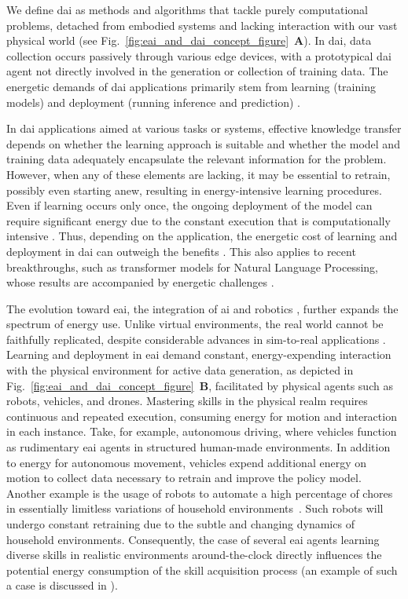 \documentclass[12pt]{article}
\begin{document}
We define \ac{dai} as methods and algorithms that tackle purely computational problems, detached from embodied systems and lacking interaction with our vast physical world (see Fig.~\ref{fig:eai_and_dai_concept_figure}~\textbf{A}). In \ac{dai}, data collection occurs passively through various edge devices, with a prototypical \ac{dai} agent not directly involved in the generation or collection of training data. The energetic demands of \ac{dai} applications primarily stem from learning (training models) and deployment (running inference and prediction) \cite{Vries2023growingenergyfootprint}.

In \ac{dai} applications aimed at various tasks or systems, effective knowledge transfer depends on whether the learning approach is suitable and whether the model and training data adequately encapsulate the relevant information for the problem. However, when any of these elements are lacking, it may be essential to retrain, possibly even starting anew, resulting in energy-intensive learning procedures. Even if learning occurs only once, the ongoing deployment of the model can require significant energy due to the constant execution that is computationally intensive \cite{Vries2023growingenergyfootprint}. Thus, depending on the application, the energetic cost of learning and deployment in \ac{dai} can outweigh the benefits \cite{Strubell2019EnergyPolicyConsiderations}. This also applies to recent breakthroughs, such as transformer models for Natural Language Processing, whose results are accompanied by energetic challenges \cite{Cao2020TowardsAccurateReliable}.

The evolution toward \ac{eai}, the integration of \ac{ai} and robotics \cite{Pfeifer2004Embodiedartificialintelligence}, further expands the spectrum of energy use. Unlike virtual environments, the real world cannot be faithfully replicated, despite considerable advances in sim-to-real applications \cite{Chebotar2019Closingsimreal}. Learning and deployment in \ac{eai} demand constant, energy-expending interaction with the physical environment for active data generation, as depicted in Fig.~\ref{fig:eai_and_dai_concept_figure}~\textbf{B}, facilitated by physical agents such as robots, vehicles, and drones. Mastering skills in the physical realm requires continuous and repeated execution, consuming energy for motion and interaction in each instance. Take, for example, autonomous driving, where vehicles function as rudimentary \ac{eai} agents in structured human-made environments. In addition to energy for autonomous movement, vehicles expend additional energy on motion to collect data necessary to retrain and improve the policy model. Another example is the usage of robots to automate a high percentage of chores in essentially limitless variations of household environments~\cite{Lehdonvirta2022futuresunpaidwork}. Such robots will undergo constant retraining due to the subtle and changing dynamics of household environments. Consequently, the case of several \ac{eai} agents learning diverse skills in realistic environments around-the-clock directly influences the potential energy consumption of the skill acquisition process (an example of such a case is discussed in \cite{Johannsmeier2025APM}).
\end{document}
